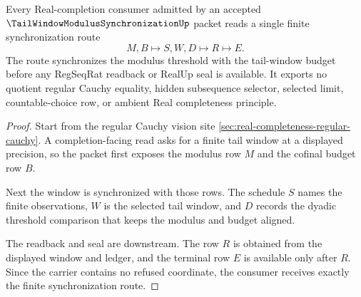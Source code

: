 \begin{theorem}
\label{thm:tail-window-modulus-synchronization-handoff}
Every Real-completion consumer admitted by an accepted $\TailWindowModulusSynchronizationUp$ packet reads a single finite synchronization route
$$
M,B \longmapsto S,W,D \longmapsto R \longmapsto E .
$$
The route synchronizes the modulus threshold with the tail-window budget before any RegSeqRat readback or RealUp seal is available. It exports no quotient regular Cauchy equality, hidden subsequence selector, selected limit, countable-choice row, or ambient Real completeness principle.
\end{theorem}
\begin{proof}
Start from the regular Cauchy vision site \autoref{sec:real-completeness-regular-cauchy}. A completion-facing read asks for a finite tail window at a displayed precision, so the packet first exposes the modulus row $M$ and the cofinal budget row $B$.

Next the window is synchronized with those rows. The schedule $S$ names the finite observations, $W$ is the selected tail window, and $D$ records the dyadic threshold comparison that keeps the modulus and budget aligned.

The readback and seal are downstream. The row $R$ is obtained from the displayed window and ledger, and the terminal row $E$ is available only after $R$. Since the carrier contains no refused coordinate, the consumer receives exactly the finite synchronization route.
\end{proof}




